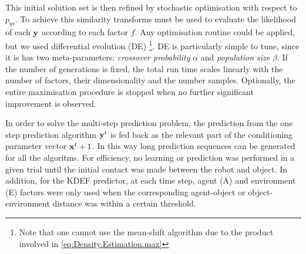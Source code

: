 This initial solution set is then refined by stochastic optimisation with respect to $p_{qs}$. To achieve this similarity transforms must be used to evaluate the likelihood of each $\mathbf{y}$ according to each factor $f$. Any optimisation routine could be applied, but we used differential evolution (DE) \cite{storn_differential_1997}\footnote{Note that one cannot use the mean-shift algorithm \cite{cheng_mean_1995}
due to the product involved in \eqref{eq:Density.Estimation.max}}.
DE is particularly simple to tune, since it is has two meta-parameters: \textit{crossover probability} $\alpha$ and \textit{population size} $\beta$. If the number of generations is fixed, the total run time scales linearly with the number of factors, their dimensionality and the number samples. Optionally, the entire maximisation procedure is stopped when
no further significant improvement is observed. 

%
%


In order to solve the multi-step prediction problem, the prediction from the one step prediction algorithm $\mathbf{y}^t$ is fed back as the relevant part of the conditioning parameter vector $\mathbf{x}^t+1$. In this way long prediction sequences can be generated for all the algoritms. For efficiency, no learning or prediction was performed in a given trial until the initial contact was made between the robot and object. In addition, for the KDEF predictor, at each time step, agent (A) and environment (E) factors were only used when the corresponding agent-object or object-environment distance was within a certain threshold.
